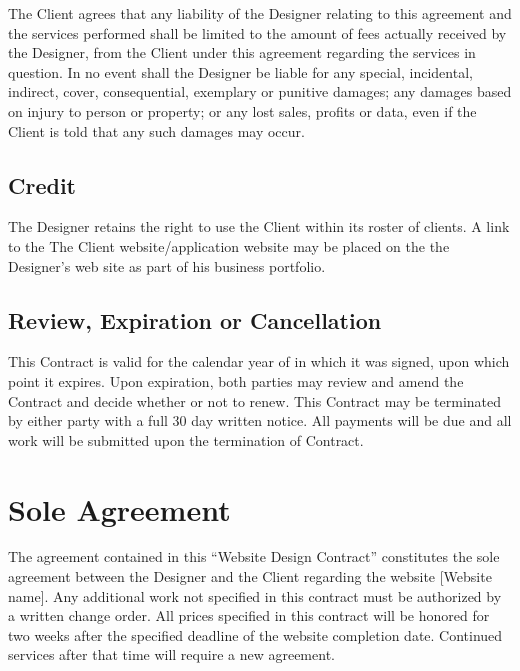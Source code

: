 \documentclass[usletter,12pt]{article} %
\begin{document}
The Client agrees that any liability of the Designer relating to this agreement and the services performed shall be limited to the amount of fees actually received by the Designer, from the Client under this agreement regarding the services in question. In no event shall the Designer be liable for any special, incidental, indirect, cover, consequential, exemplary or punitive damages; any damages based on injury to person or property; or any lost sales, profits or data, even if the Client is told that any such damages may occur.


\subsection{Credit}

The Designer retains the right to use the Client within its roster of clients. A link to the The Client website/application website may be placed on the the Designer's web site as part of his business portfolio.


\subsection{Review, Expiration or Cancellation}

This Contract is valid for the calendar year of in which it was signed, upon which point it expires. Upon expiration, both parties may review and amend the Contract and decide whether or not to renew. This Contract may be terminated by either party with a full 30 day written notice. All payments will be due and all work will be submitted upon the termination of Contract.


\section{Sole Agreement}

The agreement contained in this ``Website Design Contract'' constitutes the sole agreement between the Designer and the Client regarding the website [Website name]. Any additional work not specified in this contract must be authorized by a written change order. All prices specified in this contract will be honored for two weeks after the specified deadline of the website completion date. Continued services after that time will require a new agreement.
\end{document}
